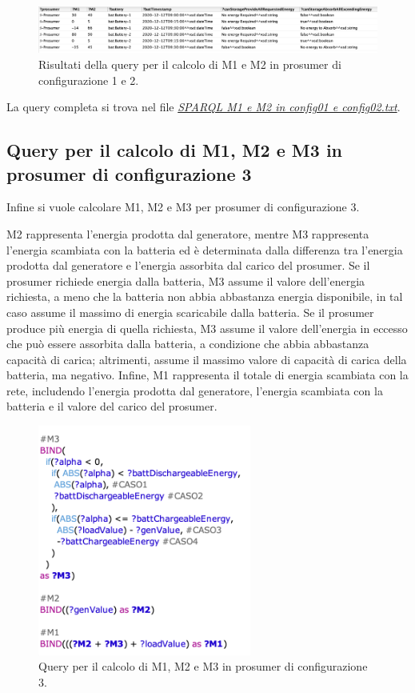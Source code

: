 \begin{figure}[H]
    \centering
    \includegraphics[width=15cm]{images/query_m1m2_config0102_res.png}
    \caption{Risultati della query per il calcolo di M1 e M2 in prosumer di configurazione 1 e 2.}
    \label{fig:query_m1_m2_res}
\end{figure}

La query completa si trova nel file \href{https://github.com/19eddie/SemanticWeb-Assignment02-03/blob/main/SPARQL%20M1%20e%20M2%20in%20config01%20e%20config02.txt}{\textit{SPARQL M1 e M2 in config01 e config02.txt}}.

\subsection{Query per il calcolo di M1, M2 e M3 in prosumer di configurazione 3}

Infine si vuole calcolare M1, M2 e M3 per prosumer di configurazione 3.

M2 rappresenta l'energia prodotta dal generatore, mentre M3 rappresenta l'energia scambiata con la batteria ed è determinata dalla differenza tra l'energia prodotta dal generatore e l'energia assorbita dal carico del prosumer.
Se il prosumer richiede energia dalla batteria, M3 assume il valore dell'energia richiesta, a meno che la batteria non abbia abbastanza energia disponibile, in tal caso assume il massimo di energia scaricabile dalla batteria. Se il prosumer produce più energia di quella richiesta,
M3 assume il valore dell'energia in eccesso che può essere assorbita dalla batteria, a condizione che abbia abbastanza capacità di carica; altrimenti, assume il massimo valore di capacità di carica della batteria, ma negativo.
Infine, M1 rappresenta il totale di energia scambiata con la rete, includendo l'energia prodotta dal generatore, l'energia scambiata con la batteria e il valore del carico del prosumer.

\begin{figure}[H]
    \centering
    \includegraphics[width=7cm]{images/query_m3.png}
    \caption{Query per il calcolo di M1, M2 e M3 in prosumer di configurazione 3.}
    \label{fig:query_m3}
\end{figure}

